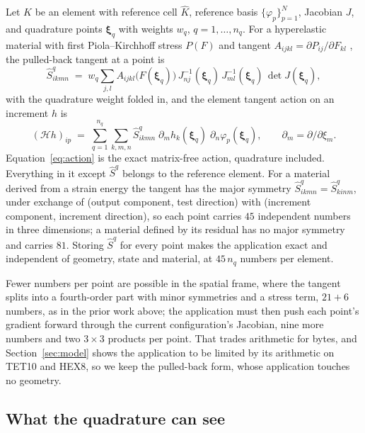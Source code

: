 \documentclass[sigconf,balance=false]{acmart}
\newcommand{\refcell}{\widehat{K}}
\newcommand{\xhat}{\boldsymbol{\xi}}
\newcommand{\Sq}{\widehat{S}^{q}}
\begin{document}
Let $K$ be an element with reference cell $\refcell$, reference basis
$\{\varphi_p\}_{p=1}^{N}$, Jacobian $J$, and quadrature points $\xhat_q$ with weights $w_q$,
$q=1,\dots,n_q$.  For a hyperelastic material with first Piola--Kirchhoff stress $P(F)$ and tangent
$A_{ijkl}=\partial P_{ij}/\partial F_{kl}$ \cite{BonetWood2008}, the pulled-back tangent at a point
is
\begin{equation}
  \Sq_{ikmn} \;=\; w_q \sum_{j,l} A_{ijkl}\bigl(F(\xhat_q)\bigr)\,
      J^{-1}_{nj}(\xhat_q)\, J^{-1}_{ml}(\xhat_q)\, \det J(\xhat_q) ,
  \label{eq:pullback}
\end{equation}
with the quadrature weight folded in, and the element tangent action on an increment $h$ is
\begin{equation}
  (\mathcal{H} h)_{ip}
  \;=\; \sum_{q=1}^{n_q} \sum_{k,m,n} \Sq_{ikmn}\;
        \partial_m h_k(\xhat_q)\; \partial_n \varphi_p(\xhat_q) ,
  \qquad \partial_m = \partial/\partial\xi_m .
  \label{eq:action}
\end{equation}
Equation~\eqref{eq:action} is the exact matrix-free action, quadrature included.  Everything in it
except $\Sq$ belongs to the reference element.  For a material derived from a strain energy the
tangent has the major symmetry $\Sq_{ikmn}=\Sq_{kinm}$, under exchange of (output component, test
direction) with (increment component, increment direction), so each point carries $45$ independent
numbers in three dimensions; a material defined by its residual has no major symmetry and carries
$81$.  Storing
$\Sq$ for every point makes the application exact and independent of geometry, state and
material, at $45\,n_q$ numbers per element.

Fewer numbers per point are possible in the spatial frame, where the tangent splits into a
fourth-order part with minor symmetries and a stress term, $21+6$ numbers, as in the prior work
above; the application must then push each point's gradient forward through the current
configuration's Jacobian, nine more numbers and two $3\times3$ products per point.  That trades
arithmetic for bytes, and Section~\ref{sec:model} shows the application to be limited by its
arithmetic on TET10 and HEX8, so we keep the pulled-back form, whose application touches no
geometry.

\subsection{What the quadrature can see}
\label{sec:minimal}
\end{document}
